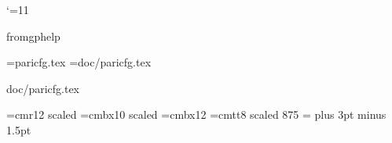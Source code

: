 %
%

\catcode`\@=11
%
%
\newif\ifSUBSECTOC\SUBSECTOCtrue
\newif\ifSUBSECDOT\SUBSECDOTtrue
\newif\ifGPHELP
\newif\ifPDF
\newread\std
\def\checkfile#1{\def\@stdfile{#1}\openin\std=#1\relax}
\long\def\@ifundef#1#2#3{\expandafter\ifx\csname
  #1\endcsname\relax#2\else#3\fi}

\@ifundef{fromgphelp}{\GPHELPfalse}{\GPHELPtrue}
\ifGPHELP %
  \overfullrule=0pt
\else     %
  \magnification=\magstephalf
  \PDFfalse
  \ifx\pdfoutput\undefined
  \else
     \ifnum\pdfoutput<1
     \else
       \PDFtrue
     \fi
  \fi
\fi

\checkfile{paricfg.tex}
\ifeof\std
  \checkfile{doc/paricfg.tex}
\fi
\ifeof\std
  \ifGPHELP\else%
    \message{paricfg.tex not found. You should run Configure.}
  \fi
  \def\vers{2.0.x}
  \def\includedir{/usr/local/include/pari}
  \def\libdir{/usr/local/lib}
\else
  \@stdfile
\fi

\font\chaptertitlefont=cmr12 scaled 
\font\chaptertitlebf=cmbx10 scaled 
\font\sectiontitlebf=cmbx12
\font\seventt=cmtt8 scaled 875
\scriptfont\ttfam=\seventt %
\parskip=6pt plus 3pt minus 1.5pt

\newwrite\toc
\def\tableofcontents{\begintitle
\openin\std=\jobname.toc
\ifeof\std
\else
  \begingroup
  \centerline{\bf Table of Contents}\medskip
  \parskip=0pt plus 1pt
  \parindent=0pt
  \catcode`\_=11 %
  \catcode`\@=11 %
  \obeylines\jobname.toc
  \endgroup
\fi
\openout\toc=\jobname.toc
\endtitle}

\newif\ifsecondpass
\newwrite\out
\newwrite\aux
\newwrite\index
\ifGPHELP %
  \def\condwrite#1#2{}
  \def\idx#1{#1}
  \def\toindex#1{}
  \def\tocwrite#1{}
  \def\label#1{}
  \def\gphelpref#1{[Label: {\tt #1}]}
  \def\gphelpsecref#1{Section~\gphelpref{#1}}
  \def\ref{\let\do=\gphelpref\doverb}
  \def\secref{\let\do=\gphelpsecref\doverb}
\else %
  \def\typeout#1{\immediate\write\out{#1}}
  \def\@namedef#1{\expandafter\def\csname#1\endcsname}
  \def\newlabel#1#2{\@ifundef{r@#1}{}{\message{Label `#1' multiply
    defined}}\global\@namedef{r@#1}{#2}}

